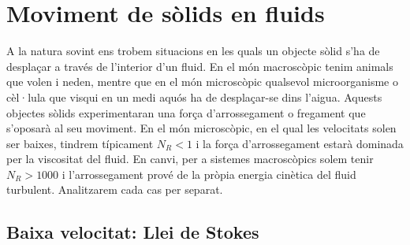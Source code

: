 \documentclass[12pt]{book}
\begin{document}
\section{Moviment de sòlids en fluids}

A la natura sovint ens trobem situacions en les quals un objecte sòlid s'ha de desplaçar a través de l'interior d'un fluid. En el món macroscòpic tenim animals que volen i neden, mentre que en el món microscòpic qualsevol microorganisme o cèl·lula que visqui en un medi aquós ha de desplaçar-se dins l'aigua. Aquests objectes sòlids experimentaran una força d'arrossegament o fregament que s'oposarà al seu moviment. En el món microscòpic, en el qual les velocitats solen ser baixes, tindrem típicament $N_R < 1$ i la força d'arrossegament estarà dominada per la viscositat del fluid. En canvi, per a sistemes macroscòpics solem tenir $N_R > 1000$ i l'arrossegament prové de la pròpia energia cinètica del fluid turbulent. Analitzarem cada cas per separat.

\subsection{Baixa velocitat: Llei de Stokes}
\end{document}

